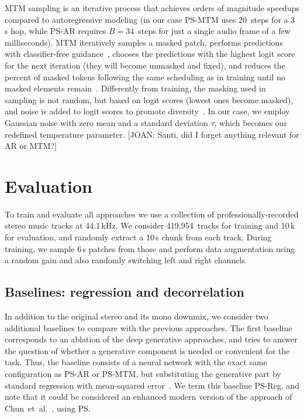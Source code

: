 \documentclass{article}
\newcommand{\joan}[1]{{\color{blue}[JOAN: #1]}}
\newcommand{\joan}[1]{}
\begin{document}
MTM sampling is an iterative process that achieves orders of magnitude speedups compared to autoregressive modeling (in our case PS-MTM uses 20~steps for a 3\,s hop, while PS-AR requires $B=34$~steps for just a single audio frame of a few milliseconds). MTM iteratively samples a masked patch, performs predictions with classifier-free guidance~\cite{Chang_2023}, chooses the predictions with the highest logit score for the next iteration (they will become unmasked and fixed), and reduces the percent of masked tokens following the same scheduling as in training until no masked elements remain~\cite{Chang_2022}. Differently from training, the masking used in sampling is not random, but based on logit scores (lowest ones become masked), and noise is added to logit scores to promote diversity~\cite{Chang_2022,Chang_2023}. In our case, we employ Gaussian noise with zero mean and a standard deviation $\tau$, which becomes our redefined temperature parameter. \joan{Santi, did I forget anything relevant for AR or MTM?}

\section{Evaluation}
\label{sec:eval}

To train and evaluate all approaches we use a collection of professionally-recorded stereo music tracks at 44.1\,kHz. We consider 419,954~tracks for training and 10\,k for evaluation, and randomly extract a 10\,s chunk from each track. During training, we sample 6\,s patches from those and perform data augmentation using a random gain and also randomly switching left and right channels.

\subsection{Baselines: regression and decorrelation}

In addition to the original stereo and its mono downmix, we consider two additional baselines to compare with the previous approaches. 
The first baseline corresponds to an ablation of the deep generative approaches, and tries to answer the question of whether a generative component is needed or convenient for the task. Thus, the baseline consists of a neural network with the exact same configuration as PS-AR or PS-MTM, but substituting the generative part by standard regression with mean-squared error~\cite{Hastie_2009}. We term this baseline PS-Reg, and note that it could be considered an enhanced modern version of the approach of Chun~et~al.~\cite{Chun_2015}, using PS.
\end{document}
